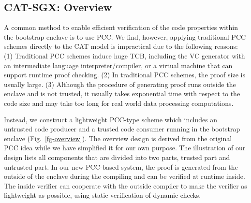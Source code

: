 {{%

}




\subsection{CAT-SGX: Overview}
\label{subsec-overview}

A common method to enable efficient verification of the code properties within the bootstrap enclave is to use PCC. We find, however, applying traditional PCC schemes directly to the CAT model is impractical due to the following reasons: (1) Traditional PCC schemes induce huge TCB, including the VC generator with an intermediate  language interpreter/compiler, or a virtual machine that can support runtime proof checking. (2) In traditional PCC schemes, the proof size is usually large. (3) Although the procedure of generating proof runs outside the enclave and is not trusted, it usually takes exponential time with respect to the code size and may take too long for real world data processing computations.



Instead, we construct a lightweight PCC-type scheme which includes an untrusted code producer and a trusted code consumer running in the bootstrap enclave (Fig.~\ref{fg-overview}). The overview design is derived from the original PCC idea while we have simplified it for our own purpose. The illustration of our design lists all components that are divided into two parts, trusted part and untrusted part. In our new PCC-based system, the proof is generated from the outside of the enclave during the compiling and can be verified at runtime inside. The inside verifier can cooperate with the outside compiler to make the verifier as lightweight as possible, using static verification of dynamic checks.

}
